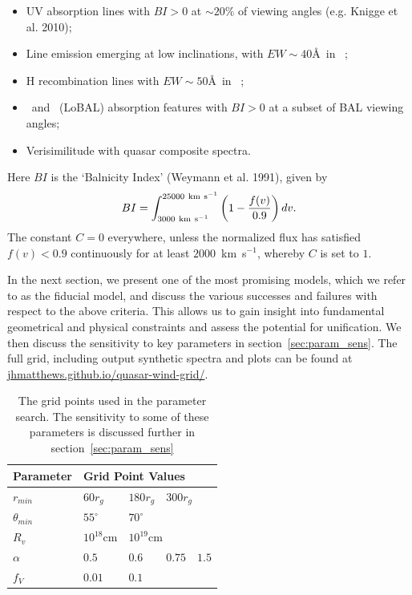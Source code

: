 \documentclass[useAMS,usenatbib]{mn2e_x}
\begin{document}
\begin{itemize}
\item UV absorption lines 
with $BI > 0$ at $\sim20\%$ of viewing angles (e.g. Knigge et al. 2010);
\item Line emission emerging at low inclinations, with $EW\sim40$\AA\ in \civline\ \citep[e.g. ][]{shen2011};
\item H recombination lines with $EW\sim50$\AA\ in \la\ \citep[e.g. ][]{shen2011};
\item  \mg\ and \al\ (LoBAL) absorption features with $BI > 0$ at a subset of 
BAL viewing angles;
\item Verisimilitude with quasar composite spectra.
\end{itemize}
Here $BI$ is the `Balnicity Index' (Weymann et al. 1991), given by
\begin{equation}
BI = \int^{25000~{\rm km~s}^{-1}}_{3000~{\rm km~s}^{-1}} \left( 1 - \frac{f(v)}{0.9} \right) dv.
\end{equation}
The constant $C=0$ everywhere, unless the normalized flux
has satisfied $f(v)<0.9$ continuously for at least $2000$~km~s$^{−1}$, 
whereby $C$ is set to $1$.

In the next section, we present one of the most promising models,
which we refer to as the fiducial model, and discuss
the various successes and failures with respect to the above criteria.
This allows us to gain insight into fundamental geometrical 
and physical constraints and assess the potential for unification. 
We then discuss the sensitivity to key parameters in section~\ref{sec:param_sens}.
The full grid, including output synthetic spectra and plots can be found at
\url{jhmatthews.github.io/quasar-wind-grid/}.

\begin{table}
\begin{tabular}{p{2cm}p{1cm}p{1cm}p{1cm}p{1cm}}
Parameter & \multicolumn{4}{|l|}{Grid Point Values}  \\
\hline \hline 
$r_{min}$ 	&	 $60r_{g}$ & $180r_{g}$ & \multicolumn{2}{|l|}{$300r_{g}$} \\ 
$\theta_{min}$ 	& $55^{\circ}$ & \multicolumn{3}{|l|}{$70^{\circ}$} \\ 
$R_v$  	        &	 $10^{18}$cm & \multicolumn{3}{|l|}{$10^{19}$cm} \\ 
$\alpha$ 	&	 $0.5$ & $0.6$ & $0.75$ & $1.5$ \\
$f_V$ 	&	 $0.01$ & \multicolumn{3}{|l|}{$0.1$}  \\
\hline 
\end{tabular}
\caption{The grid points used in the parameter search.
The sensitivity to some of these parameters is discussed 
further in section~\ref{sec:param_sens}}
\label{grid_table}
\end{table}
\end{document}
